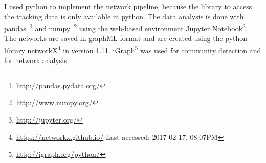 I used python to implement the network pipeline, because the library to access the tracking data is only available in python.
The data analysis is done with pandas~\footnote{\url{http://pandas.pydata.org/}} and numpy~\footnote{\url{http://www.numpy.org/}} using the web-based environment Jupyter Notebook\footnote{\url{http://jupyter.org/}}.
The networks are saved in graphML format and are created using the python library networkX\footnote{\url{https://networkx.github.io/} Last accessed: 2017-02-17, 08:07PM}  in version 1.11. iGraph\footnote{\url{http://igraph.org/python/}} was used for community detection and for network analysis.
